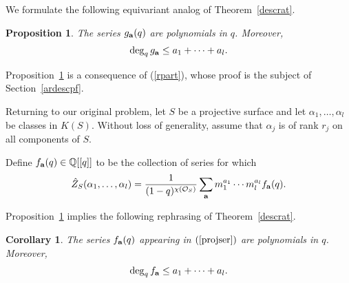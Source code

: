 \documentclass[pdftex]{sigma}
\newtheorem{Corollary}[Theorem]{Corollary}
\newtheorem{Proposition}[Theorem]{Proposition}
 { \theoremstyle{definition}
\newtheorem{Definition}[Theorem]{Definition}
\newtheorem{Note}[Theorem]{Note}
\newtheorem{Example}[Theorem]{Example}
\newtheorem{Remark}[Theorem]{Remark} }
\numberwithin{equation}{section}
\def\O{\mathcal{O}}
\def\Q{\mathbb Q}
\begin{document}
We formulate the following equivariant analog of Theorem~\ref{descrat}.

\begin{Proposition}\label{equivdesc}
The series $g_{{\bf a}}(q)$ are polynomials in $q$. Moreover,
\begin{gather*}
\deg_{q} g_{\bf{a}}\leq a_1+\dots+a_l.
\end{gather*}
\end{Proposition}
Proposition~\ref{equivdesc} is a consequence of (\ref{rpart}), whose proof is the subject of Section~\ref{ardescpf}.

Returning to our original problem, let $S$ be a projective surface and let $\alpha_1,\dots,\alpha_l$ be classes in $K(S)$. Without loss of generality, assume that $\alpha_j$ is of rank $r_j$ on all components of $S$.

Define $f_{{\bf a}}(q)\in \Q[[q]]$ to be the collection of series for which
 \begin{gather} \label{projser}
\hat{Z}_S(\alpha_1,\dots,\alpha_l)=\frac{1}{(1-q)^{\chi(\O_S)}}\sum_{{\bf a}} m_1^{a_1}\cdots m_l^{a_l} f_{{\bf a}}(q).\end{gather}

Proposition~\ref{equivdesc} implies the following rephrasing of Theorem~\ref{descrat}.

\begin{Corollary}\label{projdesc}
The series $f_{{\bf a}}(q)$ appearing in $(\ref{projser})$ are polynomials in $q$. Moreover,
\begin{gather*}
\deg_q f_{{\bf a}} \leq a_1+\dots+a_l.
\end{gather*}
\end{Corollary}
\end{document}
